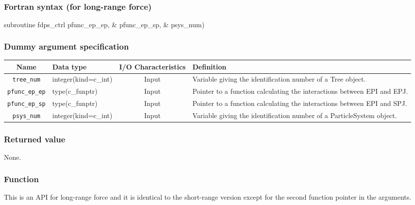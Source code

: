 \subsubsection*{Fortran syntax (for long-range force)}
\begin{screen}
\begin{spverbatim}
subroutine fdps_ctrl%
                                               pfunc_ep_ep, &
                                               pfunc_ep_sp, &
                                               psys_num)
\end{spverbatim}
\end{screen}

\subsubsection*{Dummy argument specification}
\begin{table}[h]
\begin{tabularx}{\linewidth}{clcX}
\toprule
\rowcolor{Snow2}
Name & Data type & I/O Characteristics & Definition \\
\midrule
\verb|tree_num|    & integer(kind=c\_int)   & Input     & Variable giving the identification number of a Tree object. \\
\verb|pfunc_ep_ep| & type(c\_funptr)        & Input     & Pointer to a function calculating the interactions between EPI and EPJ. \\
\verb|pfunc_ep_sp| & type(c\_funptr)        & Input     & Pointer to a function calculating the interactions between EPI and SPJ. \\
\verb|psys_num|    & integer(kind=c\_int)   & Input     & Variable giving the identification number of a ParticleSystem object. \\
\bottomrule
\end{tabularx}
\end{table}


\subsubsection*{Returned value}
None.

\subsubsection*{Function}
This is an API for long-range force and it is identical to the short-range version except for the second function pointer in the arguments.
\clearpage

